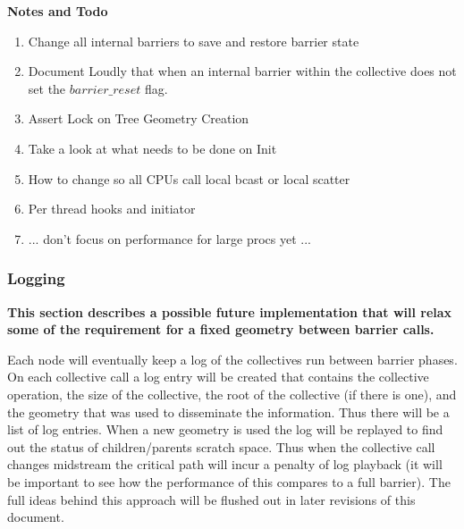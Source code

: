 \documentclass[times,10pt]{article}
\begin{document}

\noindent \textbf{Notes and Todo}
\begin{enumerate}
\item Change all internal barriers to save and restore barrier state
\item Document Loudly that when an internal barrier within the collective does not set the $barrier\_reset$ flag.
\item Assert Lock on Tree Geometry Creation
\item Take a look at what needs to be done on Init
\item How to change so all CPUs call local bcast or local scatter
\item Per thread hooks and initiator 
\item ... don't focus on performance for large procs yet ... 
\end{enumerate}



\subsubsection{Logging}
\textbf{This section describes a possible future implementation that will relax some of the requirement for a fixed geometry between barrier calls.}

Each node will eventually keep a log of the collectives run between barrier phases. On each collective call a log entry will be created that contains the collective operation, the size of the collective, the root of the collective (if there is one), and the geometry that was used to disseminate the information. Thus there will be a list of log entries. When a new geometry is used the log will be replayed to find out the status of children/parents scratch space. Thus when the collective call changes midstream the critical path will incur a penalty of log playback (it will  be important to see how the performance of this compares to a full barrier). The full ideas behind this approach will be flushed out in later revisions of this document.
\end{document}
